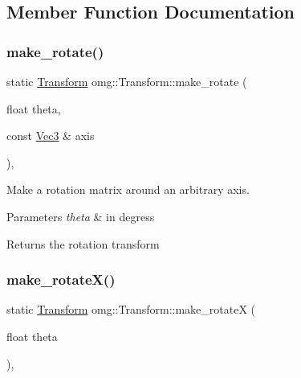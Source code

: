 \subsection{Member Function Documentation}
\mbox{\label{classomg_1_1_transform_a749e019617a935bc3666f7dc3b0ac529}} 
\subsubsection{\texorpdfstring{make\_rotate()}{make\_rotate()}}
{\footnotesize\ttfamily static \mbox{\hyperlink{classomg_1_1_transform}{Transform}} omg\+::\+Transform\+::make\+\_\+rotate (\begin{DoxyParamCaption}\item[{float}]{theta,  }\item[{const \mbox{\hyperlink{namespaceomg_a45a9482677fee9933ff369b49894e316}{Vec3}} \&}]{axis }\end{DoxyParamCaption})\hspace{0.3cm}{\ttfamily [inline]}, {\ttfamily [static]}}



Make a rotation matrix around an arbitrary axis. 


\begin{DoxyParams}{Parameters}
{\em theta} & in degress \\
\hline
\end{DoxyParams}
\begin{DoxyReturn}{Returns}
the rotation transform 
\end{DoxyReturn}
\mbox{\label{classomg_1_1_transform_a95df27f1a663e5b43c678a3528d9096c}} 
\subsubsection{\texorpdfstring{make\_rotateX()}{make\_rotateX()}}
{\footnotesize\ttfamily static \mbox{\hyperlink{classomg_1_1_transform}{Transform}} omg\+::\+Transform\+::make\+\_\+rotateX (\begin{DoxyParamCaption}\item[{float}]{theta }\end{DoxyParamCaption})\hspace{0.3cm}{\ttfamily [inline]}, {\ttfamily [static]}}



